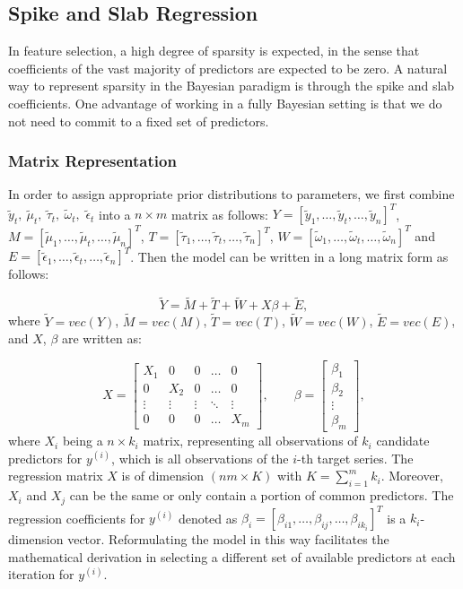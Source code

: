 \documentclass[twoside,11pt]{article}
\begin{document}
\subsection{Spike and Slab Regression}
 In feature selection, a high degree of sparsity is expected, in the sense that coefficients of the vast majority of predictors are expected to be zero. A natural way to represent sparsity in the Bayesian paradigm is through the spike and slab coefficients. One advantage of working in a fully Bayesian setting is that we do not need to commit to a fixed set of predictors.

\subsubsection{Matrix Representation}
In order to assign appropriate prior distributions to parameters, we first combine  $\tilde{y}_t,\ \tilde{\mu}_t,\ \tilde{\tau}_t,\ \tilde{\omega}_t,$ $\tilde{\epsilon}_t$ into a $n\times m$ matrix as follows: $Y=[\tilde{y}_1,\dots,\tilde{y}_t,
\dots, \tilde{y}_n]^T$, $M=[\tilde{\mu}_1,\dots,\tilde{\mu}_t,
\dots, \tilde{\mu}_n]^T$,  $T=[\tilde{\tau}_1,\dots,\tilde{\tau}_t,
\dots, \tilde{\tau}_n]^T$, $W=[\tilde{\omega}_1,\dots,\tilde{\omega}_t,
\dots, \tilde{\omega}_n]^T$ and $E=[\tilde{\epsilon}_1,\dots,\tilde{\epsilon}_t,
\dots, \tilde{\epsilon}_n]^T$. Then the model can be written in a long matrix form as follows:

\begin{equation} \label{eq:matrixform}
\tilde{Y}=\tilde{M}+\tilde{T}+\tilde{W}+X\beta+\tilde{E},
\end{equation}
where $\tilde{Y}=vec(Y)$, $\tilde{M}=vec(M)$, $\tilde{T}=vec(T)$, $ \tilde{W}=vec(W)$, $\tilde{E}=vec(E)$, and $X$, $\beta$ are written as:

\begin{equation} \label{eq:stack}
X=\begin{bmatrix}
X_1 & 0 & 0 & \dots  & 0 \\
0 & X_2 & 0 & \dots  & 0 \\
\vdots & \vdots & \vdots & \ddots & \vdots \\
0 & 0 & 0 & \dots  & X_{m}
\end{bmatrix},
\quad\quad \beta= \begin{bmatrix}
\beta_1  \\
\beta_2  \\
\vdots  \\
\beta_m
\end{bmatrix},
\end{equation}
where $X_i$ being a $n \times k_i$ matrix, representing all observations of  $k_i$ candidate
predictors for $y^{(i)}$, which is all observations of the $i$-th target series. The regression matrix $X$ is of dimension $(nm\times K)$ with
$K=\sum_{i=1}^{m} k_i$.
Moreover, $X_i$ and $X_j$ can be the same or only contain a portion of common predictors.
The regression coefficients for $y^{(i)}$ denoted as $\beta_i=[\beta_{i1},\dots,\beta_{ij},\dots,\beta_{ik_i}]^T$ is a $k_i$-dimension vector.
Reformulating the model in this way facilitates the mathematical derivation in selecting a different set of available predictors at each iteration for $y^{(i)}$.
\end{document}
